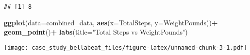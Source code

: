 \documentclass[
]{article}
\newenvironment{Shaded}{\begin{snugshade}}{\end{snugshade}}
\newcommand{\AttributeTok}[1]{\textcolor[rgb]{0.13,0.29,0.53}{#1}}
\newcommand{\FunctionTok}[1]{\textcolor[rgb]{0.13,0.29,0.53}{\textbf{#1}}}
\newcommand{\NormalTok}[1]{#1}
\newcommand{\OtherTok}[1]{\textcolor[rgb]{0.56,0.35,0.01}{#1}}
\newcommand{\SpecialCharTok}[1]{\textcolor[rgb]{0.81,0.36,0.00}{\textbf{#1}}}
\newcommand{\StringTok}[1]{\textcolor[rgb]{0.31,0.60,0.02}{#1}}
\begin{document}
\begin{Shaded}
\end{Shaded}

\begin{verbatim}
## [1] 8
\end{verbatim}

\begin{Shaded}
\begin{Highlighting}[]
\FunctionTok{ggplot}\NormalTok{(}\AttributeTok{data=}\NormalTok{combined\_data, }\FunctionTok{aes}\NormalTok{(}\AttributeTok{x=}\NormalTok{TotalSteps, }\AttributeTok{y=}\NormalTok{WeightPounds))}\SpecialCharTok{+}
  \FunctionTok{geom\_point}\NormalTok{()}\SpecialCharTok{+}
  \FunctionTok{labs}\NormalTok{(}\AttributeTok{title=}\StringTok{"Total Steps vs WeightPounds"}\NormalTok{)}
\end{Highlighting}
\end{Shaded}

\texttt{[image: case\_study\_bellabeat\_files/figure-latex/unnamed-chunk-3-1.pdf]}
\end{document}
